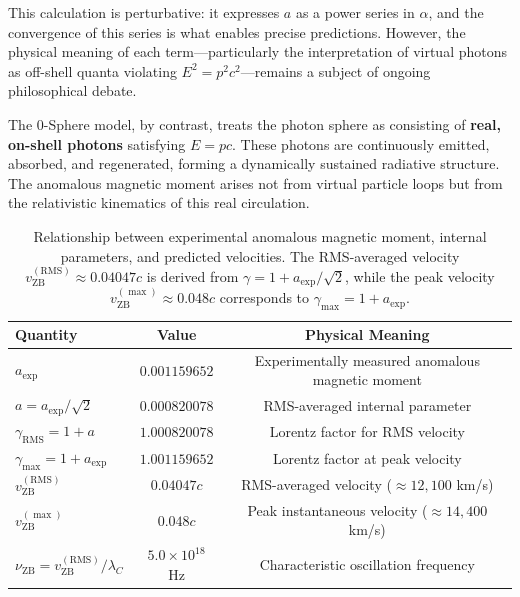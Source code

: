 \documentclass[12pt,letterpaper]{article}
\begin{document}
This calculation is perturbative: it expresses $a$ as a power series in $\alpha$, and the convergence of this series is what enables precise predictions. However, the physical meaning of each term—particularly the interpretation of virtual photons as off-shell quanta violating $E^2 = p^2c^2$—remains a subject of ongoing philosophical debate.

The 0-Sphere model, by contrast, treats the photon sphere as consisting of \textbf{real, on-shell photons} satisfying $E = pc$. These photons are continuously emitted, absorbed, and regenerated, forming a dynamically sustained radiative structure. The anomalous magnetic moment arises not from virtual particle loops but from the relativistic kinematics of this real circulation.

\begin{table}[t!]
\centering
\renewcommand{\arraystretch}{1.3}
\begin{tabular}{lcc}
\toprule
\textbf{Quantity} & \textbf{Value} & \textbf{Physical Meaning} \\
\midrule
$a_{\mathrm{exp}}$ 
& $0.001159652$ 
& Experimentally measured anomalous magnetic moment \\
\addlinespace[0.1cm]
$a = a_{\mathrm{exp}}/\sqrt{2}$ 
& $0.000820078$ 
& RMS-averaged internal parameter \\
\addlinespace[0.1cm]
$\gamma_{\mathrm{RMS}} = 1 + a$ 
& $1.000820078$ 
& Lorentz factor for RMS velocity \\
\addlinespace[0.1cm]
$\gamma_{\max} = 1 + a_{\mathrm{exp}}$ 
& $1.001159652$ 
& Lorentz factor at peak velocity \\
\addlinespace[0.1cm]
$v_{\mathrm{ZB}}^{(\mathrm{RMS})}$ 
& $0.04047c$ 
& RMS-averaged velocity ($\approx 12{,}100$ km/s) \\
\addlinespace[0.1cm]
$v_{\mathrm{ZB}}^{(\max)}$ 
& $0.048c$ 
& Peak instantaneous velocity ($\approx 14{,}400$ km/s) \\
\addlinespace[0.1cm]
$\nu_{\mathrm{ZB}} = v_{\mathrm{ZB}}^{(\mathrm{RMS})}/\lambda_C$ 
& $5.0 \times 10^{18}$ Hz 
& Characteristic oscillation frequency \\
\bottomrule
\end{tabular}
\caption{Relationship between experimental anomalous magnetic moment, internal parameters, and predicted velocities. The RMS-averaged velocity $v_{\mathrm{ZB}}^{(\mathrm{RMS})} \approx 0.04047c$ is derived from $\gamma = 1 + a_{\mathrm{exp}}/\sqrt{2}$, while the peak velocity $v_{\mathrm{ZB}}^{(\max)} \approx 0.048c$ corresponds to $\gamma_{\max} = 1 + a_{\mathrm{exp}}$.}
\label{tab:velocity_hierarchy}
\end{table}
\end{document}
